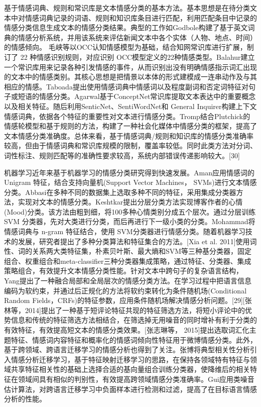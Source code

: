 基于情感词典、规则和常识库是文本情感分类的基本方法。基本思想是在待分类文本中对情感词典记录的词语、规则和知识库条目进行匹配，利用匹配条目中记录的情感分类信息生成文本的情感分类结果。典型的工作如Godbole\cite{godbole2007large}构建了基于英文词典的情感分析系统，并用该系统来评估新闻文本中各个实体（人物、地点、时间）的情感倾向。 毛峡等\cite{毛峡2011人机情感交互}以OCC认知情感模型为基础，结合知网常识库进行扩展，制订了 22 种情感识别规则，对应识别 OCC模型定义的22种情感类型。Balahur\cite{balahur2011detecting}建立一个常识库用来记录各种引发情感的事件，从而识别出没有明确情感指示词汇出现的文本中的情感类别。其核心思想是把情景以本体的形式建模成一连串动作及与其相应的情感。Taboada\cite{taboada2011lexicon}提出使用情感词典中情感词以及程度副词和否定词特征对句子或短语的情感分类。Agarwal\cite{agarwal2015sentiment}基于ConceptNet常识库提取文本表达中的重要概念以及相关特征。随后利用SenticNet、SentiWordNet和 General Inquirer构建上下文情感词典，依据各个特征的重要性对文本进行情感分类。Tromp\cite{tromp2015pattern}结合Plutchick的情感轮模型和基于规则的方法，构建了一种社会化媒体中情感分类的框架，提高了文本情感分类准确度。总体来看，基于情感词典/规则和知识库的情感分类准确率较高，但由于情感词典和常识库规模的限制，覆盖率较低。同时此类方法对分词、词性标注、规则匹配等的准确性要求较高，系统内部错误传递影响较大。[30]

机器学习近年来基于机器学习的情感分类研究得到快速发展。Aman应用情感词的 Unigram 特征，结合支持向量机(Support Vector Machines， SVMs)进行文本情感分类。Abbasi\cite{abbasi2008affect}在多种不同的数据集上选取多种不同的特征，采用集成分类器方法，实现对文本的情感分类。Keshtkar\cite{keshtkar2012hierarchical}提出分层分类方法实现博客作者的心情(Mood)分类。该方法由粗到细，将100多种心情类别分成五个层次。通过分层训练 SVM 分类器，先对大类进行分类，而后再进行下一级小类的分类。Mohammad\cite{mohammad2012portable}将情感词典与 n-gram 特征结合，使用 SVM分类器进行情感分类。随着机器学习技术的发展，研究者提出了多种分类算法和特征集合的方法。[Xia et al. 2011]使用词性、词的关系两大类特征集，朴素贝叶斯、最大熵和SVM等三种基分类器，固定组合、权重组合和meta-classifier三种分类器集成策略，通过特征、分类器、集成策略组合，有效提升文本情感分类性能。针对文本中跨句子的复杂语言结构，Yang提出了一种融合局部和全局层次的情感分类方法。在学习过程中把语言信息编码为软约束，并通过后正规化的方法将软约束转化为条件随机场(Conditional Random Fields，CRFs)的特征参数，应用条件随机场解决情感分析问题。[29][张林等，2014]提出了一种基于短评论特征共现的特征筛选方法，将短小评论中的优势信息和传统的特征筛选方法相结合，在筛选掉无用噪音的同时增补有利于分类的有效特征，有效提高短文本的情感分类效果。[张志琳等， 2015]提出选取词汇化主题特征、情感词内容特征和概率化的情感词倾向性特征用于微博情感分类。此外，基于跨领域、跨语言迁移学习的情感分析也得到了关注。张博\cite{张博2015一种基于跨领域典型相关性分析的迁移学习方法}将典型相关性分析引入情感分析迁移学习，基于特征映射迁移学习的思路，在保持各领域特有特征与领域共享特征相关性的基础上选择合适的基向量组合训练分类器，使降维后的相关特征在领域间具有相似的判别性，有效提高跨领域情感分类准确率。Gui\cite{gui2015novel}应用类噪音估计算法，对跨语言迁移学习中负面样本进行检测和过滤，提高了在目标语言情感分析的性能。


